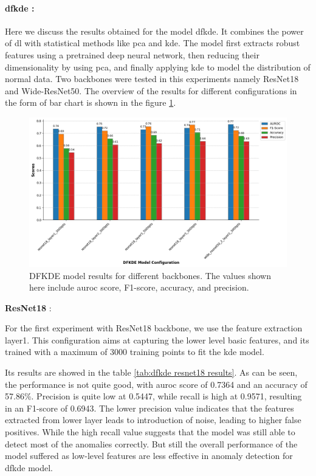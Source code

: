 \paragraph*{\gls{dfkde} : }

Here we discuss the results obtained for the model \gls{dfkde}. It combines the power of \gls{dl} with statistical methods like \gls{pca} and \gls{kde}. The model first extracts robust features using a pretrained deep neural network, then reducing their dimensionality by using \gls{pca}, and finally applying \gls{kde} to model the distribution of normal data. Two backbones were tested in this experiments namely ResNet18 and Wide-ResNet50. The overview of the results for different configurations in the form of bar chart is shown in the figure \ref{fig:dfkde model results}.

\begin{figure}[ht!]
    \centering
    \includegraphics[width=1.2\linewidth]{Rohit_Master_Thesis//Images/dfkde_model_results.png}
    \caption{DFKDE model results for different backbones. The values shown here include \gls{auroc} score, F1-score, accuracy, and precision.}
    \label{fig:dfkde model results}
\end{figure}

\textbf{ResNet18} : 

For the first experiment with ResNet18 backbone, we use the feature extraction layer1. This configuration aims at capturing the lower level basic features, and its trained with a maximum of 3000 training points to fit the \gls{kde} model.

Its results are showed in the table \ref{tab:dfkde resnet18 results}. As can be seen, the performance is not quite good, with \gls{auroc} score of 0.7364 and an accuracy of 57.86\%. Precision is quite low at 0.5447, while recall is high at 0.9571, resulting in an F1-score of 0.6943. The lower precision value indicates that the features extracted from lower layer leads to introduction of noise, leading to higher false positives. While the high recall value suggests that the model was still able to detect most of the anomalies correctly. But still the overall performance of the model suffered as low-level features are less effective in anomaly detection for \gls{dfkde} model.

